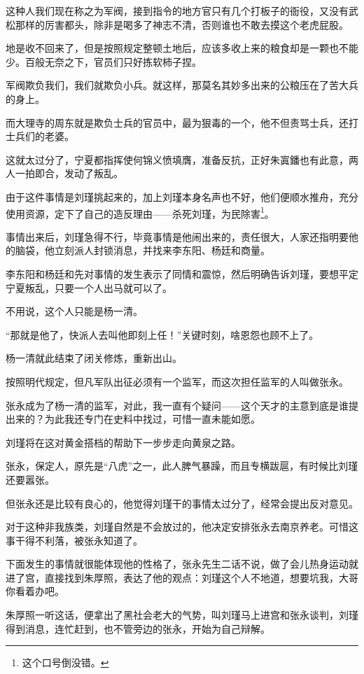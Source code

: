 \begin{multicols}{\theparacolNo}
		这种人我们现在称之为军阀，接到指令的地方官只有几个打板子的衙役，又没有武松那样的厉害都头，除非是喝多了神志不清，否则谁也不敢去摸这个老虎屁股。

		地是收不回来了，但是按照规定整顿土地后，应该多收上来的粮食却是一颗也不能少。百般无奈之下，官员们只好拣软柿子捏。

		军阀欺负我们，我们就欺负小兵。就这样，那莫名其妙多出来的公粮压在了苦大兵的身上。

		而大理寺的周东就是欺负士兵的官员中，最为狠毒的一个，他不但责骂士兵，还打士兵们的老婆。

		这就太过分了，宁夏都指挥使何锦义愤填膺，准备反抗，正好朱寘鐇也有此意，两人一拍即合，发动了叛乱。

		由于这件事情是刘瑾挑起来的，加上刘瑾本身名声也不好，他们便顺水推舟，充分使用资源，定下了自己的造反理由——杀死刘瑾，为民除害\footnote{这个口号倒没错。}。

		事情出来后，刘瑾急得不行，毕竟事情是他闹出来的，责任很大，人家还指明要他的脑袋，他立刻派人封锁消息，并找来李东阳、杨廷和商量。

		李东阳和杨廷和先对事情的发生表示了同情和震惊，然后明确告诉刘瑾，要想平定宁夏叛乱，只要一个人出马就可以了。

		不用说，这个人只能是杨一清。

		“那就是他了，快派人去叫他即刻上任！”关键时刻，啥恩怨也顾不上了。

		杨一清就此结束了闭关修炼，重新出山。

		按照明代规定，但凡军队出征必须有一个监军，而这次担任监军的人叫做张永。

		张永成为了杨一清的监军，对此，我一直有个疑问——这个天才的主意到底是谁提出来的？为此我还专门在史料中找过，可惜一直未能如愿。

		刘瑾将在这对黄金搭档的帮助下一步步走向黄泉之路。

		张永，保定人，原先是“八虎”之一，此人脾气暴躁，而且专横跋扈，有时候比刘瑾还要嚣张。

		但张永还是比较有良心的，他觉得刘瑾干的事情太过分了，经常会提出反对意见。

		对于这种非我族类，刘瑾自然是不会放过的，他决定安排张永去南京养老。可惜这事干得不利落，被张永知道了。

		下面发生的事情就很能体现他的性格了，张永先生二话不说，做了会儿热身运动就进了宫，直接找到朱厚照，表达了他的观点：刘瑾这个人不地道，想要坑我，大哥你看着办吧。

		朱厚照一听这话，便拿出了黑社会老大的气势，叫刘瑾马上进宫和张永谈判，刘瑾得到消息，连忙赶到，也不管旁边的张永，开始为自己辩解。


\end{multicols}
